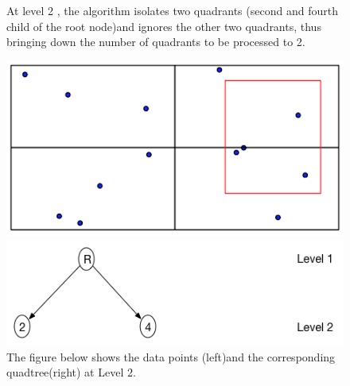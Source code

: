 \documentclass{article}
\begin{document}
\begin{figure}[ht]

At level 2 , the algorithm isolates  two quadrants (second and fourth child of the root node)and ignores the other two quadrants, thus bringing down the number of quadrants to be processed to 2.
\caption{The figure below shows the data points (left)and the corresponding quadtree(right) at Level 2.}
  \centering
  \begin{minipage}[b]{0.35\textwidth}
    \includegraphics[width=\textwidth]{2Quad_2}  
  \end{minipage}
  \hfill
  \begin{minipage}[b]{0.6\textwidth}
    \includegraphics[width=\textwidth]{2Quad_2_tree}
  \end{minipage}
\end{figure}
\end{document}

